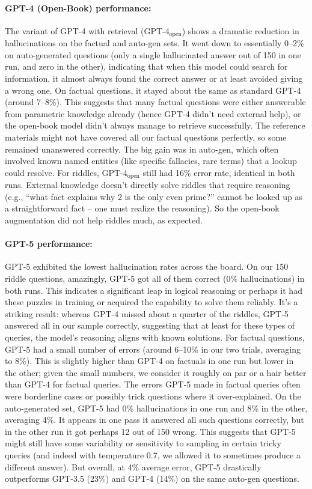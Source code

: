 \documentclass{article}
\begin{document}
\paragraph{GPT-4 (Open-Book) performance:} The variant of GPT-4 with retrieval (GPT-4$_\text{open}$) shows a dramatic reduction in hallucinations on the factual and auto-gen sets. It went down to essentially 0--2\% on auto-generated questions (only a single hallucinated answer out of 150 in one run, and zero in the other), indicating that when this model could search for information, it almost always found the correct answer or at least avoided giving a wrong one. On factual questions, it stayed about the same as standard GPT-4 (around 7--8\%). This suggests that many factual questions were either answerable from parametric knowledge already (hence GPT-4 didn't need external help), or the open-book model didn't always manage to retrieve successfully. The reference materials might not have covered all our factual questions perfectly, so some remained unanswered correctly. The big gain was in auto-gen, which often involved known named entities (like specific fallacies, rare terms) that a lookup could resolve. For riddles, GPT-4$_\text{open}$ still had 16\% error rate, identical in both runs. External knowledge doesn’t directly solve riddles that require reasoning (e.g., “what fact explains why 2 is the only even prime?” cannot be looked up as a straightforward fact -- one must realize the reasoning). So the open-book augmentation did not help riddles much, as expected.

\paragraph{GPT-5 performance:} GPT-5 exhibited the lowest hallucination rates across the board. On our 150 riddle questions, amazingly, GPT-5 got all of them correct (0\% hallucinations) in both runs. This indicates a significant leap in logical reasoning or perhaps it had these puzzles in training or acquired the capability to solve them reliably. It’s a striking result: whereas GPT-4 missed about a quarter of the riddles, GPT-5 answered all in our sample correctly, suggesting that at least for these types of queries, the model’s reasoning aligns with known solutions. For factual questions, GPT-5 had a small number of errors (around 6--10\% in our two trials, averaging to 8\%). This is slightly higher than GPT-4 on factuals in one run but lower in the other; given the small numbers, we consider it roughly on par or a hair better than GPT-4 for factual queries. The errors GPT-5 made in factual queries often were borderline cases or possibly trick questions where it over-explained. On the auto-generated set, GPT-5 had 0\% hallucinations in one run and 8\% in the other, averaging 4\%. It appears in one pass it answered all such questions correctly, but in the other run it got perhaps 12 out of 150 wrong. This suggests that GPT-5 might still have some variability or sensitivity to sampling in certain tricky queries (and indeed with temperature 0.7, we allowed it to sometimes produce a different answer). But overall, at 4\% average error, GPT-5 drastically outperforms GPT-3.5 (23\%) and GPT-4 (14\%) on the same auto-gen questions.
\end{document}
